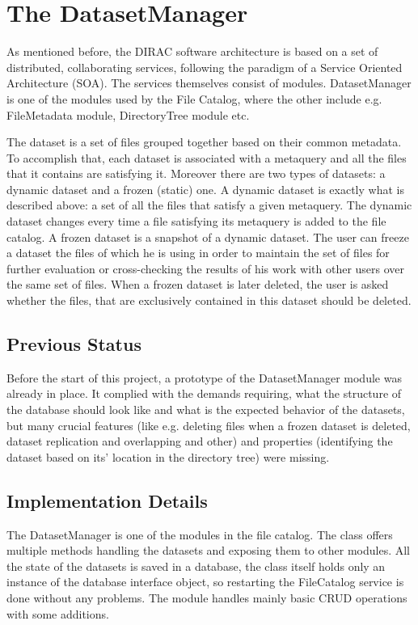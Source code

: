 \chapter{The DatasetManager}

As mentioned before, the DIRAC software architecture is based on a set of distributed,
collaborating services, following the paradigm of a Service
Oriented Architecture (SOA). The services themselves consist of
modules. DatasetManager is one of the modules used by the File Catalog, where the other include
e.g. FileMetadata module, DirectoryTree module etc. 

The dataset is a set of files grouped together based on their common metadata. To accomplish
that, each dataset is associated with a metaquery and all the files that it contains are
satisfying it. Moreover there are two types of datasets: a dynamic dataset and 
a frozen (static) one. A dynamic dataset is exactly what is described above: a set of all the
files that satisfy a given metaquery. The dynamic dataset changes every time a file satisfying
its metaquery is added to the file catalog. A frozen dataset is a snapshot of a dynamic dataset. The
user can freeze a dataset the files of which he is using in order to maintain the set of files for
further evaluation or cross-checking the results of his work with other users over the same
set of files. When a frozen dataset is later deleted, the user is asked whether the files, that 
are exclusively contained in this dataset should be deleted. 

\section{Previous Status}
Before the start of this project, a prototype of the DatasetManager module was already 
in place. It complied with the demands requiring, what the structure of the database 
should look like and what is the 
expected behavior of the datasets, but many crucial features (like e.g. deleting files when a 
frozen dataset is deleted, dataset replication and overlapping and other) and properties (identifying
the dataset based on its' location in the directory tree) were missing.

\section{Implementation Details}

The DatasetManager is  one of the modules in the file catalog. The class offers
multiple methods handling the datasets and exposing them to other modules. All the state of the 
datasets is saved in a database, the class itself holds only an instance of the database interface
object, so restarting the FileCatalog service is done without any problems. The module handles mainly
basic CRUD operations with some additions.

